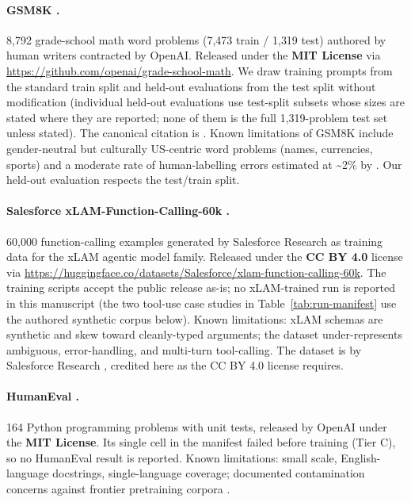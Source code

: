 \paragraph{GSM8K \cite{cobbe2021training}.}
8{,}792 grade-school math word problems (7{,}473 train / 1{,}319 test)
authored by human writers contracted by OpenAI. Released under the
\textbf{MIT License} via \url{https://github.com/openai/grade-school-math}.
We draw training prompts from the standard train split and held-out
evaluations from the test split without modification (individual held-out
evaluations use test-split subsets whose sizes are stated where they are
reported; none of them is the full 1{,}319-problem test set unless stated). The canonical
citation is \citet{cobbe2021training}. Known limitations of GSM8K include
gender-neutral but culturally US-centric word problems (names, currencies,
sports) and a moderate rate of human-labelling errors estimated at
\textasciitilde 2\% by \cite{zhang2024gsm1k}. Our held-out evaluation
respects the test/train split.

\paragraph{Salesforce xLAM-Function-Calling-60k \cite{liu2024xlam}.}
60{,}000 function-calling examples generated by Salesforce Research as
training data for the xLAM agentic model family. Released under the
\textbf{CC BY 4.0} license via \url{https://huggingface.co/datasets/Salesforce/xlam-function-calling-60k}.
The training scripts accept the public release as-is; no xLAM-trained run
is reported in this manuscript (the two tool-use case studies in
Table~\ref{tab:run-manifest} use the authored synthetic corpus below).
Known limitations: xLAM schemas are synthetic and skew toward cleanly-typed
arguments; the dataset under-represents ambiguous, error-handling, and
multi-turn tool-calling. The dataset is by Salesforce Research \cite{liu2024xlam}, credited here as
the CC BY 4.0 license requires.

\paragraph{HumanEval \cite{chen2021codex}.}
164 Python programming problems with unit tests, released by OpenAI under
the \textbf{MIT License}. Its single cell in the manifest failed before
training (Tier C), so no HumanEval result is reported. Known
limitations: small scale, English-language docstrings, single-language
coverage; documented contamination concerns against frontier pretraining
corpora \cite{riddell2024contamination}.

